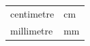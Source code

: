 {\begin{tabular}[t]{|l|l|}
        centimetre &
        cm%
     \tabularnewline\cline{1-1}\cline{2-2}
        millimetre &
        mm%
     \tabularnewline\cline{1-1}\cline{2-2}
    \end{tabular}} %
